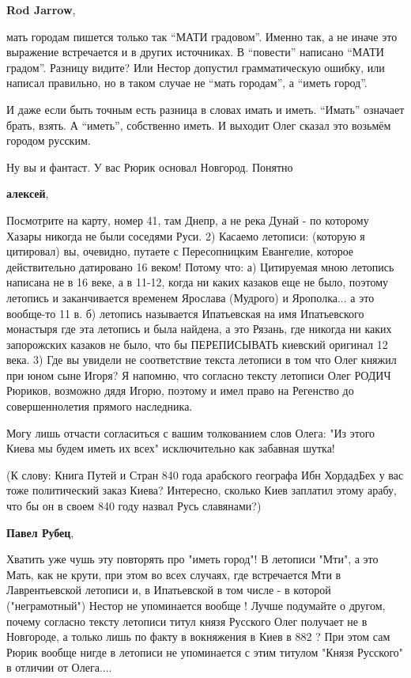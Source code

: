 \begin{itemize}
\begin{itemize}
\textbf{Rod Jarrow}, 

мать городам пишется только так \enquote{МАТИ градовом}. Именно так, а не иначе это
выражение встречается и в других источниках. В \enquote{повести} написано \enquote{МАТИ
градом}. Разницу видите? Или Нестор допустил грамматическую ошибку, или написал
правильно, но в таком случае не \enquote{мать городам}, а \enquote{иметь город}.

И даже если быть точным есть разница в словах имать и иметь. \enquote{Имать} означает
брать, взять. А \enquote{иметь}, собственно иметь. И выходит Олег сказал это возьмём
городом русским.

Ну вы и фантаст. У вас Рюрик основал Новгород. Понятно

\textbf{алексей}, 

Посмотрите на карту, номер 41, там Днепр, а не река Дунай - по которому Хазары
никогда не были соседями Руси. 2) Касаемо летописи: (которую я цитировал) вы,
очевидно, путаете с Пересопницким Евангелие, которое действительно датировано
16 веком! Потому что: а) Цитируемая мною летопись написана не в 16 веке, а в
11-12, когда ни каких казаков еще не было, поэтому летопись и заканчивается
временем Ярослава (Мудрого) и Ярополка... а это вообще-то 11 в. б) летопись
называется Ипатьевская на имя Ипатьевского монастыря где эта летопись и была
найдена, а это Рязань, где никогда ни каких запорожских казаков не было, что бы
ПЕРЕПИСЫВАТЬ киевский оригинал 12 века. 3) Где вы увидели не соответствие
текста летописи в том что Олег княжил при юном сыне Игоря? Я напомню, что
согласно тексту летописи Олег РОДИЧ Рюриков, возможно дядя Игорю, поэтому и
имел право на Регенство до совершеннолетия прямого наследника.

Могу лишь отчасти согласиться с вашим толкованием слов Олега: "Из этого Киева
мы будем иметь их всех" исключительно как забавная шутка!

(К слову: Книга Путей и Стран 840 года арабского географа Ибн ХордадБех у вас
тоже политический заказ Киева? Интересно, сколько Киев заплатил этому арабу,
что бы он в своем 840 году назвал Русь славянами?)

\textbf{Павел Рубец}, 

Хватить уже чушь эту повторять про "иметь город"! В летописи "Мти", а это Мать,
как не крути, при этом во всех случаях, где встречается Мти в Лаврентьевской
летописи и, в Ипатьевской в том числе - в которой ("неграмотный") Нестор не
упоминается вообще ! Лучше подумайте о другом, почему согласно тексту летописи
титул князя Русского Олег получает не в Новгороде, а только лишь по факту в
вокняжения в Киев в 882 ? При этом сам Рюрик вообще нигде в летописи не
упоминается с этим титулом "Князя Русского" в отличии от Олега....


\end{itemize}
\end{itemize}
